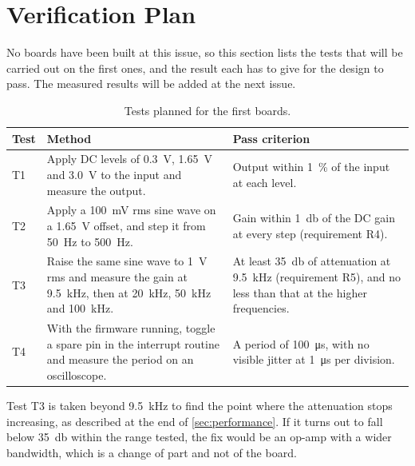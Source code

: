 
\section{Verification Plan}
\label{sec:verification}

No boards have been built at this issue, so this section lists the tests that
will be carried out on the first ones, and the result each has to give for
the design to pass. The measured results will be added at the next issue.

\begin{table}[htbp]
\centering
\begin{tabularx}{\textwidth}{@{} l X X @{}}
\toprule
\textbf{Test} & \textbf{Method} & \textbf{Pass criterion} \\
\midrule
T1 & Apply DC levels of \qty{0.3}{\volt}, \qty{1.65}{\volt} and
     \qty{3.0}{\volt} to the input and measure the output.
   & Output within \qty{1}{\percent} of the input at each level. \\
\addlinespace
T2 & Apply a \qty{100}{\milli\volt} rms sine wave on a \qty{1.65}{\volt}
     offset, and step it from \qty{50}{\hertz} to \qty{500}{\hertz}.
   & Gain within \qty{1}{\decibel} of the DC gain at every step
     (requirement R4). \\
\addlinespace
T3 & Raise the same sine wave to \qty{1}{\volt} rms and measure the gain at
     \qty{9.5}{\kilo\hertz}, then at \qty{20}{\kilo\hertz},
     \qty{50}{\kilo\hertz} and \qty{100}{\kilo\hertz}.
   & At least \qty{35}{\decibel} of attenuation at \qty{9.5}{\kilo\hertz}
     (requirement R5), and no less than that at the higher frequencies. \\
\addlinespace
T4 & With the firmware running, toggle a spare pin in the interrupt routine
     and measure the period on an oscilloscope.
   & A period of \qty{100}{\micro\second}, with no visible jitter at
     \qty{1}{\micro\second} per division. \\
\bottomrule
\end{tabularx}
\caption{Tests planned for the first boards.}
\label{tab:tests}
\end{table}

Test T3 is taken beyond \qty{9.5}{\kilo\hertz} to find the point where the
attenuation stops increasing, as described at the end of
\cref{sec:performance}. If it turns out to fall below \qty{35}{\decibel}
within the range tested, the fix would be an op-amp with a wider bandwidth,
which is a change of part and not of the board.

